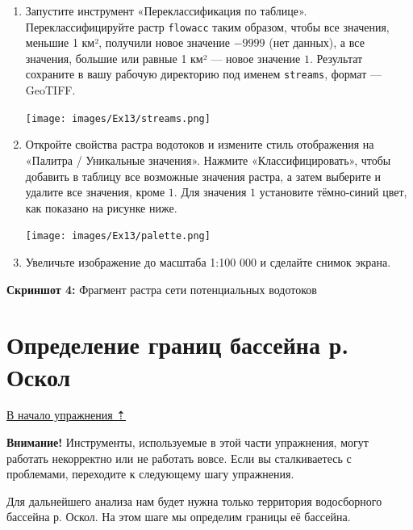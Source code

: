 \documentclass[
  12pt,
]{book}
\begin{document}
\begin{enumerate}
\def\labelenumi{\arabic{enumi}.}
\item
  Запустите инструмент «Переклассификация по таблице». Переклассифицируйте растр \texttt{flowacc} таким образом, чтобы все значения, меньшие 1 км², получили новое значение \(-9999\) (нет данных), а все значения, большие или равные 1 км² --- новое значение \(1\). Результат сохраните в вашу рабочую директорию под именем \texttt{streams}, формат --- GeoTIFF.

  \texttt{[image: images/Ex13/streams.png]}
\item
  Откройте свойства растра водотоков и измените стиль отображения на «Палитра / Уникальные значения». Нажмите «Классифицировать», чтобы добавить в таблицу все возможные значения растра, а затем выберите и удалите все значения, кроме \(1\). Для значения \(1\) установите тёмно-синий цвет, как показано на рисунке ниже.

  \texttt{[image: images/Ex13/palette.png]}
\item
  Увеличьте изображение до масштаба 1:100 000 и сделайте снимок экрана.
\end{enumerate}

\textbf{Скриншот 4:} Фрагмент растра сети потенциальных водотоков

\hypertarget{hydrodem-basin}{%
\section{Определение границ бассейна р. Оскол}\label{hydrodem-basin}}

\protect\hyperlink{hydrodem}{В начало упражнения ⇡}

\textbf{Внимание!} Инструменты, используемые в этой части упражнения, могут работать некорректно или не работать вовсе. Если вы сталкиваетесь с проблемами, переходите к следующему шагу упражнения.

Для дальнейшего анализа нам будет нужна только территория водосборного бассейна р. Оскол. На этом шаге мы определим границы её бассейна.
\end{document}
